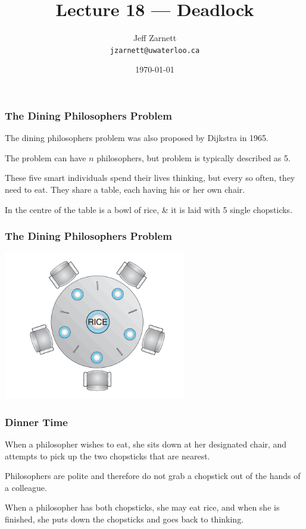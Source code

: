 

\title{Lecture 18 --- Deadlock }

\author{Jeff Zarnett \\ \small \texttt{jzarnett@uwaterloo.ca}}
\date{\today}




\begin{frame}
  \titlepage

 \end{frame}

\begin{frame}
\frametitle{The Dining Philosophers Problem}

The dining philosophers problem was also proposed by Dijkstra in 1965. 

The problem can have $n$ philosophers, but problem is typically described as 5. 

 These five smart individuals spend their lives thinking, but every so often, they need to eat. They share a table, each having his or her own chair. 
 
In the centre of the table is a bowl of rice, \& it is laid with 5 single chopsticks. 

\end{frame}

\begin{frame}
\frametitle{The Dining Philosophers Problem}

\begin{center}
\includegraphics[width=0.6\textwidth]{images/philosopher-table.png}
\end{center}

\end{frame}

\begin{frame}
\frametitle{Dinner Time}

When a philosopher wishes to eat, she sits down at her designated chair, and attempts to pick up the two chopsticks that are nearest. 

Philosophers are polite and therefore do not grab a chopstick out of the hands of a colleague.

 When a philosopher has both chopsticks, she may eat rice, and when she is finished, she puts down the chopsticks and goes back to thinking.


\end{frame}


